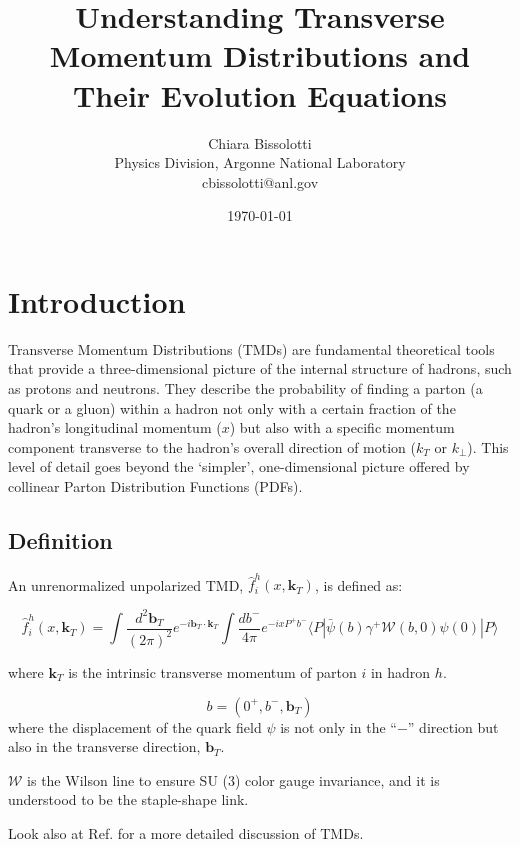 \documentclass{article}
\title{Understanding Transverse Momentum Distributions and Their Evolution Equations}
\author{Chiara Bissolotti\\
        Physics Division, Argonne National Laboratory \\
        cbissolotti@anl.gov}
\date{\today}
\begin{document}
\maketitle
\tableofcontents
\newpage

\section{Introduction}

Transverse Momentum Distributions (TMDs) are fundamental theoretical tools that provide a three-dimensional picture of the internal structure of
hadrons, such as protons and neutrons. They describe the probability of finding a parton (a quark or a gluon) within a hadron not only with a certain
fraction of the hadron's longitudinal momentum ($x$) but also with a specific momentum component transverse to the hadron's overall direction of
motion ($k_T$ or $k_\perp$). This level of detail goes beyond the `simpler', one-dimensional picture offered by collinear Parton Distribution
Functions (PDFs).

\subsection{Definition}

An unrenormalized unpolarized TMD, $\hat{f}_i^{h}(x, \mathbf{k}_T)$, is defined as:

\begin{equation}
  \hat{f}_i^{h}(x, \mathbf{k}_T) = \int \frac{d^2 \mathbf{b}_T}{{(2\pi)}^2} e^{-i \mathbf{b}_T \cdot \mathbf{k}_T} \int \frac{db^-}{4\pi}
  e^{-ix P^+ b^-} \langle P | \bar{\psi}(b) \gamma^+ {\mathcal{W}{(b,0)}} \psi(0) | P \rangle
  \label{eq:correlator_definition}
\end{equation}

where $\mathbf{k}_T$ is the intrinsic transverse momentum of parton $i$ in hadron $h$.

\begin{equation}
  b = (0^{+}, b^-, \mathbf{b}_T)
\end{equation}
%
where the displacement of the quark field $\psi$ is not only in the ``$-$'' direction but also in the transverse direction, $\mathbf{b}_T$.

$\mathcal{W}$ is the Wilson line to ensure SU (3) color gauge invariance, and it is understood to be the staple-shape link.

Look also at Ref.\cite{Collins:2011zzd} for a more detailed discussion of TMDs.
\end{document}
